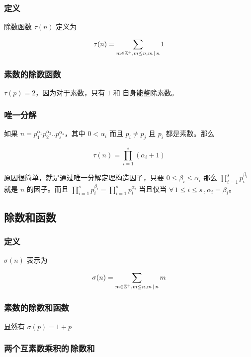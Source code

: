 \subsubsection{定义}
 
除数函数 $\tau(n)$ 定义为

\[
\tau(n) = \sum_{m \in \mathbb{Z}^+, m \le n, m \,\vert\, n }1
\]

\subsubsection{素数的除数函数}

$\tau(p) = 2$，因为对于素数，只有 $1$ 和 自身能整除素数。\\

\subsubsection{唯一分解}

如果 $n = p_1^{\alpha_1}p_2^{\alpha_2}..p_s^{\alpha_s}$，其中 $0 < \alpha_i$ 而且 $p_i \ne p_j $ 且 $p_i$ 都是素数。那么 

\[
\tau(n) = \prod_{i=1}^{s}(\alpha_i + 1)
\]

原因很简单，就是通过唯一分解定理构造因子，只要 $0 \le \beta_i \le \alpha_i$ 那么 $\prod_{i=1}^{s}p_i^{\beta_i}$ 就是 $n$ 的因子。而且 
$\prod_{i=1}^{s}p_i^{\beta_i} = \prod_{i=1}^{s}p_i^{\alpha_i}$ 当且仅当 $\forall \, 1 \le i \le s \,, \alpha_i = \beta_i$。

\subsection{除数和函数}

\subsubsection{定义}

$\sigma(n) $ 表示为

\[
    \sigma(n) = \sum_{m \in \mathbb{Z}^+, m \le n, m \,\vert\, n }m
\]

\subsubsection{素数的除数和函数}

显然有 $\sigma(p) = 1 + p$

\subsubsection{两个互素数乘积的\,除数和}

